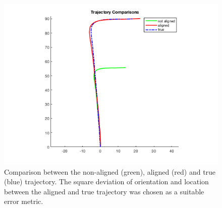 \begin{figure}[H]
  \centering
    \includegraphics[width=\textwidth]{figures/aligned}
  \caption{Comparison between the non-aligned (green), aligned (red) and true (blue) trajectory. The square deviation of orientation and location between the aligned and true trajectory was chosen as a suitable error metric.}
  \label{fig:alignment}
\end{figure}

